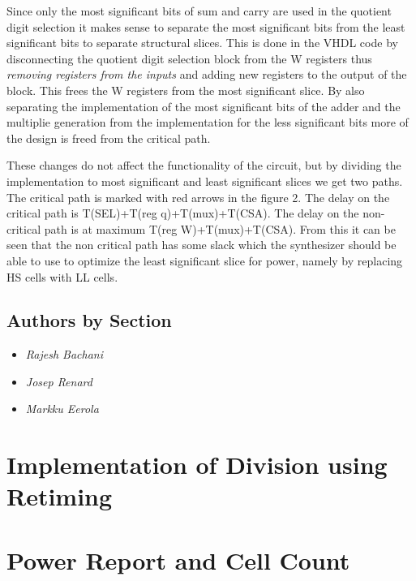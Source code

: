 \documentclass[11pt,a4paper]{article}
\begin{document}
Since only the most significant bits of sum and carry are used in the quotient digit selection it makes sense to separate the most significant bits from the least significant bits to separate structural slices. This is done in the VHDL code by disconnecting the quotient digit selection block from the W registers thus \textit{removing registers from the inputs} and adding new registers to the output of the block. This frees the W registers from the most significant slice. By also separating the implementation of the most significant bits of the adder and the multiplie generation from the implementation for the less significant bits more of the design is freed from the critical path.

These changes do not affect the functionality of the circuit, but by dividing the implementation to most significant and least significant slices we get two paths. The critical path is marked with red arrows in the figure 2. The delay on the critical path is T(SEL)+T(reg q)+T(mux)+T(CSA). The delay on the non-critical path is at maximum T(reg W)+T(mux)+T(CSA). From this it can be seen that the non critical path has some slack which the synthesizer should be able to use to optimize the least significant slice for power, namely by replacing HS cells with LL cells.


\subsection{Authors by Section}
\begin{itemize}
\item \textit{Rajesh Bachani} 
\item \textit{Josep Renard} 
\item \textit{Markku Eerola} 
\end{itemize}

\section{Implementation of Division using Retiming}
\label{section:impl}
\section{Power Report and Cell Count}
\label{section:power}
\end{document}
